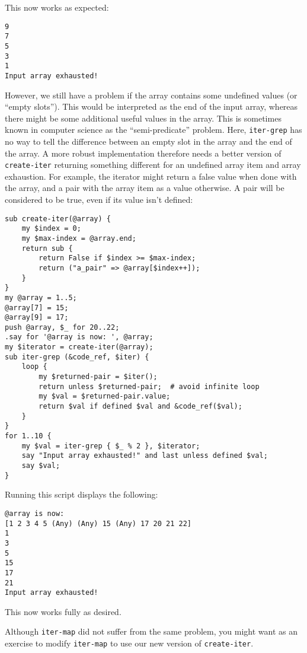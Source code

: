 This now works as expected:

\begin{verbatim}
9
7
5
3
1
Input array exhausted!
\end{verbatim}

However, we still have a problem if the array 
contains some undefined values (or ``empty slots''). This 
would be interpreted as the end of the input array, whereas 
there might be some additional useful values in the array. 
This is sometimes known in computer science as the 
``semi-predicate'' problem. Here, {\tt iter-grep} has no 
way to tell the difference between an empty slot in the array 
and the end of the array. A more robust implementation 
therefore needs a better version of {\tt create-iter}  
returning something different for an undefined array item 
and array exhaustion. For example, the iterator might return 
a false value when done with the array, and a pair with the 
array item as a value otherwise. A pair will be considered 
to be true, even if its value isn't defined:

\begin{verbatim}
sub create-iter(@array) {
    my $index = 0;
    my $max-index = @array.end;
    return sub { 
        return False if $index >= $max-index; 
        return ("a_pair" => @array[$index++]);
    }
}
my @array = 1..5;
@array[7] = 15;
@array[9] = 17;
push @array, $_ for 20..22;
.say for '@array is now: ', @array;
my $iterator = create-iter(@array);
sub iter-grep (&code_ref, $iter) {
    loop {
        my $returned-pair = $iter();
        return unless $returned-pair;  # avoid infinite loop
        my $val = $returned-pair.value;
        return $val if defined $val and &code_ref($val);
	}
}
for 1..10 {
    my $val = iter-grep { $_ % 2 }, $iterator;
    say "Input array exhausted!" and last unless defined $val;
    say $val;
}
\end{verbatim}

Running this script displays the following:
\begin{verbatim}
@array is now:
[1 2 3 4 5 (Any) (Any) 15 (Any) 17 20 21 22]
1
3
5
15
17
21
Input array exhausted!
\end{verbatim}

This now works fully as desired.

Although {\tt iter-map} did not suffer from the same problem, 
you might want as an exercise to modify {\tt iter-map}
to use our new version of {\tt create-iter}.

